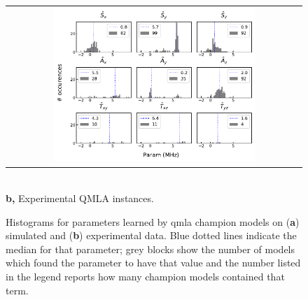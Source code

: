 \begin{figure}
    \centering
    \begin{tabular}{@{}c@{}}
        \centering
        \includegraphics[width=0.7\textwidth]{experimental_study/figures/params_experimental.pdf}
    \end{tabular}
    \\
    \small \textbf{b,} Experimental QMLA instances.
    \caption[
        Histograms for parameters learned by \gls{qmla} champion models on simulated and experimental data. 
    ]{
        Histograms for parameters learned by \gls{qmla} champion models on (\textbf{a}) simulated  and (\textbf{b}) experimental data. 
        Blue dotted lines indicate the median for that parameter; grey blocks show the number of models which found the parameter
        to have that value and the number listed in the legend reports how many champion models contained that term.
    }
    \label{fig:nv_learned_params}
\end{figure}

